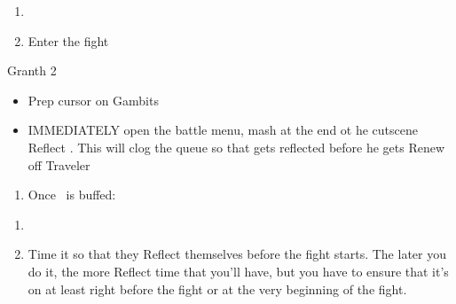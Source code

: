 \begin{enumerate}[resume]
\item \GirlsGambitOn
\item Enter the fight
\end{enumerate}
\begin{battle}{Granth 2}
\begin{itemize}
\vaanf Stand in front of the girls until \vaan\ gets targeted, then loop around the girls so that  doesn't get an attack on.
\item Prep cursor on Gambits
\item IMMEDIATELY open the battle menu, mash at the end ot he cutscene
\ashef Reflect \ashe. This will clog the queue so that  gets reflected before he gets Renew off
\vaanf Traveler 
\end{itemize}
\end{battle}
\begin{enumerate}[resume]
\ashef Dispel \ashe
\penelof Decoy \vaan
\vaanf Activate Switch
\item Once \vaan\ is buffed:
\end{enumerate}
\begin{menu}\party{\balthier, \ashe, \penelo}\begin{itemize}\battleactive\end{itemize}\end{menu}
\begin{enumerate}[resume]
\item \GirlsGambitOn
\item Time it so that they Reflect themselves before the fight starts. The later you do it, the more Reflect time that you'll have, but you have to ensure that it's on at least right before the fight or at the very beginning of the fight.
\end{enumerate}
